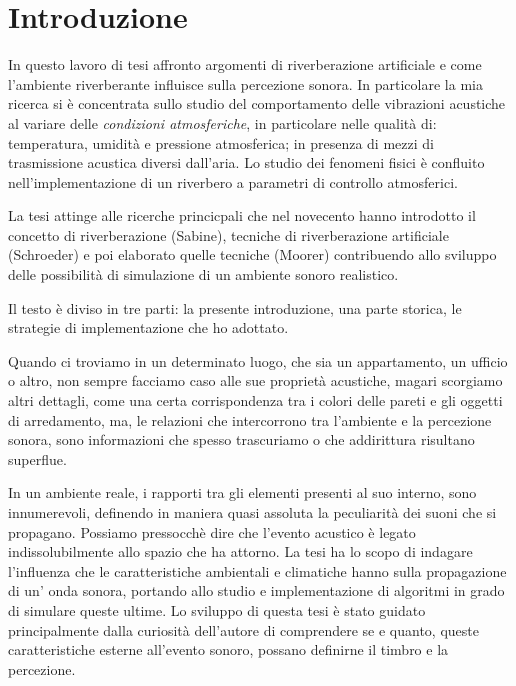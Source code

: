 \chapter*{Introduzione}
\label{chp:Introduzione}


In questo lavoro di tesi affronto argomenti di riverberazione artificiale e
come l'ambiente riverberante influisce sulla percezione sonora. In particolare
la mia ricerca si è concentrata sullo studio del comportamento delle vibrazioni
acustiche al variare delle \emph{condizioni atmosferiche}, in particolare nelle
qualità di: temperatura, umidità e pressione atmosferica; in presenza di mezzi
di trasmissione acustica diversi dall’aria. Lo studio dei fenomeni fisici è
confluito nell'implementazione di un riverbero a parametri di controllo
atmosferici.

La tesi attinge alle ricerche princicpali che nel novecento hanno introdotto il
concetto di riverberazione (Sabine), tecniche di riverberazione artificiale
(Schroeder) e poi elaborato quelle tecniche (Moorer) contribuendo allo sviluppo
delle possibilità di simulazione di un ambiente sonoro realistico.

Il testo è diviso in tre parti: la presente introduzione, una parte storica, le
strategie di implementazione che ho adottato.

\bigskip


Quando ci troviamo in un determinato luogo, che sia un appartamento, un ufficio o altro, non sempre facciamo caso alle sue proprietà acustiche, magari scorgiamo altri dettagli, come una certa corrispondenza tra i colori delle pareti e gli oggetti di arredamento, ma, le relazioni che intercorrono tra l’ambiente e la percezione sonora, sono informazioni che spesso trascuriamo o che addirittura risultano superflue.

In un ambiente reale, i rapporti tra gli elementi presenti al suo interno, sono innumerevoli, definendo in maniera quasi assoluta la peculiarità dei suoni che si propagano. Possiamo pressocchè dire che l’evento acustico è legato indissolubilmente allo spazio che ha attorno. La tesi ha lo scopo di indagare l’influenza che le caratteristiche ambientali e climatiche hanno sulla propagazione di un’ onda sonora, portando allo studio e implementazione di algoritmi in grado di simulare queste ultime. Lo sviluppo di questa tesi è stato guidato principalmente dalla curiosità dell’autore di comprendere se e quanto, queste caratteristiche esterne all’evento sonoro, possano definirne il timbro e la percezione.
